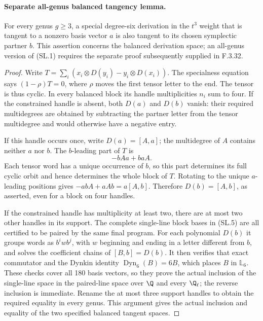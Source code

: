 \paragraph{Separate all-genus balanced tangency lemma.}
For every genus $g\geq3$, a special degree-six derivation in
the $t^3$ weight that is tangent to a nonzero basis vector
$a$ is also tangent to its chosen symplectic partner $b$.
This assertion concerns the balanced derivation space; an
all-genus version of (SL.1) requires the separate proof subsequently supplied in F.3.32.

\begin{proof}
Write $T=\sum_i(x_i\otimes D(y_i)-y_i\otimes D(x_i))$.
The specialness equation says $(1-\rho)T=0$, where $\rho$
moves the first tensor letter to the end. The tensor is thus
cyclic. In every balanced block its handle multiplicities
$n_i$ sum to four. If the constrained handle is absent,
both $D(a)$ and $D(b)$ vanish: their required multidegrees
are obtained by subtracting the partner letter from the
tensor multidegree and would otherwise have a negative entry.

If this handle occurs once, write $D(a)=[A,a]$; the
multidegree of $A$ contains neither $a$ nor $b$. The
$b$-leading part of $T$ is
\[
                      -bAa+baA.
\]
Each tensor word has a unique occurrence of $b$, so this
part determines its full cyclic orbit and hence determines
the whole block of $T$. Rotating to the unique $a$-leading
positions gives $-abA+aAb=a[A,b]$. Therefore
$D(b)=[A,b]$, as asserted, even for a block on four handles.

If the constrained handle has multiplicity at least two,
there are at most two other handles in its support. The
complete single-line block bases in (SL.5) are all
certified to be paired by the same final program.
For each polynomial $D(b)$ it groups words as
$b^i w b^j$, with $w$ beginning and ending in a letter
different from $b$, and solves the coefficient chains of
$[B,b]=D(b)$. It then verifies that exact commutator and
the Dynkin identity $\operatorname{Dyn}_6(B)=6B$, which
places $B$ in $\mathbb L_6$. These checks cover all 180
basis vectors, so they prove the actual inclusion of the
single-line space in the paired-line space over $\Q$ and
every $\Q_\ell$; the reverse inclusion is immediate.
Rename the at most three support
handles to obtain the required equality in every genus.
This argument gives the actual inclusion and equality of
the two specified balanced tangent spaces.
\end{proof}

